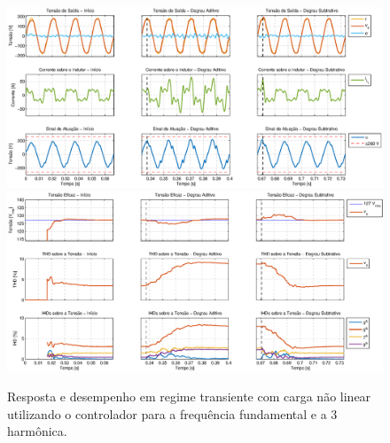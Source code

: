 \documentclass[repeatfields,oneside,overleaf]{tcc}
\begin{document}
\begin{figure}[h]
    \centering
    \caption{Resposta e desempenho em regime transiente com carga não linear utilizando o controlador para a frequência fundamental e a 3{\textordfeminine} harmônica.}
    \includegraphics[trim={80 50 1 20}, clip, width=\linewidth]{fig/closed_3.eps}
    \\\vspace{0.475cm}
    \includegraphics[trim={80 20 1 20}, clip, width=\linewidth]{fig/harm_3.eps}
\end{figure}
\end{document}
